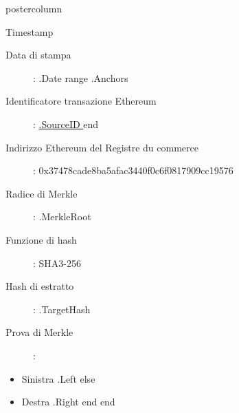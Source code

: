 \documentclass[roundedcorners=true, titleposition=center]{beamerthemeruhuisstijlposter}
\begin{document}
\begin{frame}
\begin{columns}
\begin{column}{0.95\textwidth}
\begin{beamercolorbox}[center, wd=\textwidth]{postercolumn}
\begin{minipage}[T]{0.95\textwidth}
    \hfill
\parbox[t][\columnheight]{\textwidth}{%

\begin{block}{Timestamp}
\begin{description}
\item [Data di stampa] :\linebreak
{{ .Date }}
{{ range .Anchors }}
\item [Identificatore transazione Ethereum] :\linebreak
\href{https://etherscan.io/tx/0x{{ .SourceID }} }{ {{.SourceID }} }
{{ end }}
\item[Indirizzo Ethereum del Registre du commerce
] :\linebreak
0x37478cade8ba5afac3440f0c6f0817909cc19576
\item[Radice di Merkle] :\linebreak
{{ .MerkleRoot }}
\item[Funzione di hash] : \linebreak
SHA3-256
\item[Hash di estratto] :\linebreak
{{ .TargetHash }}
\item[Prova di Merkle] :
\end{description}
\begin{itemize}
{{ range .Proof }}
    {{ if .Left }}
        \item Sinistra {{ .Left }}
    {{ else }}
        \item Destra {{ .Right }}
    {{ end }}
{{ end }}
\end{itemize}
\end{block}
}
\end{minipage}
\end{beamercolorbox}
\end{column}
\end{columns}
\end{frame}
\end{document}
